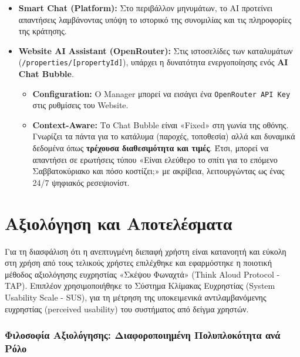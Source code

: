 \documentclass[
	12pt, %
	oneside, %
	greek,
	onehalfspacing, %
	liststotoc, %
	toctotoc, %
	parskip, %
	headsepline, %
]{MastersDoctoralThesis} %
\newcommand{\code}[1]{\texttt{#1}}
\begin{document}
\begin{itemize}
    \item \textbf{Smart Chat (Platform):} Στο περιβάλλον μηνυμάτων, το AI προτείνει απαντήσεις λαμβάνοντας υπόψη το ιστορικό της συνομιλίας και τις πληροφορίες της κράτησης.
    \item \textbf{Website AI Assistant (OpenRouter):} Στις ιστοσελίδες των καταλυμάτων (\code{/properties/[propertyId]}), υπάρχει η δυνατότητα ενεργοποίησης ενός \textbf{AI Chat Bubble}.
    \begin{itemize}
        \item \textbf{Configuration:} Ο Manager μπορεί να εισάγει ένα \code{OpenRouter API Key} στις ρυθμίσεις του Website.
        \item \textbf{Context-Aware:} Το Chat Bubble είναι «Fixed» στη γωνία της οθόνης. Γνωρίζει τα πάντα για το κατάλυμα (παροχές, τοποθεσία) αλλά και δυναμικά δεδομένα όπως \textbf{τρέχουσα διαθεσιμότητα και τιμές}. Έτσι, μπορεί να απαντήσει σε ερωτήσεις τύπου «Είναι ελεύθερο το σπίτι για το επόμενο Σαββατοκύριακο και πόσο κοστίζει;» με ακρίβεια, λειτουργώντας ως ένας 24/7 ψηφιακός ρεσεψιονίστ.
    \end{itemize}
\end{itemize}


\chapter{Αξιολόγηση και Αποτελέσματα}
\label{chap:evaluation}

Για τη διασφάλιση ότι η ανεπτυγμένη διεπαφή χρήστη είναι κατανοητή και εύκολη στη χρήση από τους τελικούς χρήστες επιλέχθηκε και εφαρμόστηκε η ποιοτική μέθοδος αξιολόγησης ευχρηστίας «Σκέψου Φωναχτά» (Think Aloud Protocol - TAP). Επιπλέον χρησιμοποιήθηκε το Σύστημα Κλίμακας Ευχρηστίας (System Usability Scale - SUS), για τη μέτρηση της υποκειμενικά αντιλαμβανόμενης ευχρηστίας (perceived usability) του συστήματος από δείγμα χρηστών.

\subsection{Φιλοσοφία Αξιολόγησης: Διαφοροποιημένη Πολυπλοκότητα ανά Ρόλο}
\label{subsec:evaluation-philosophy}
\end{document}
